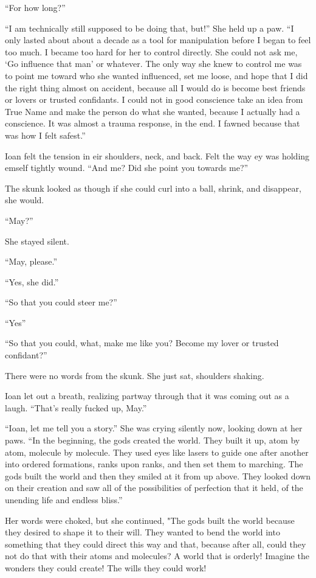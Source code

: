 ``For how long?''

``I am technically still supposed to be doing that, but!'' She held up a paw. ``I only lasted about about a decade as a tool for manipulation before I began to feel too much. I became too hard for her to control directly. She could not ask me, `Go influence that man' or whatever. The only way she knew to control me was to point me toward who she wanted influenced, set me loose, and hope that I did the right thing almost on accident, because all I would do is become best friends or lovers or trusted confidants. I could not in good conscience take an idea from True Name and make the person do what she wanted, because I actually had a conscience. It was almost a trauma response, in the end. I fawned because that was how I felt safest.''

Ioan felt the tension in eir shoulders, neck, and back. Felt the way ey was holding emself tightly wound. ``And me? Did she point you towards me?''

The skunk looked as though if she could curl into a ball, shrink, and disappear, she would.

``May?''

She stayed silent.

``May, please.''

``Yes, she did.''

``So that you could steer me?''

``Yes''

``So that you could, what, make me like you? Become my lover or trusted confidant?''

There were no words from the skunk. She just sat, shoulders shaking.

Ioan let out a breath, realizing partway through that it was coming out as a laugh. ``That's really fucked up, May.''

``Ioan, let me tell you a story.'' She was crying silently now, looking down at her paws. ``In the beginning, the gods created the world. They built it up, atom by atom, molecule by molecule. They used eyes like lasers to guide one after another into ordered formations, ranks upon ranks, and then set them to marching. The gods built the world and then they smiled at it from up above. They looked down on their creation and saw all of the possibilities of perfection that it held, of the unending life and endless bliss.''

Her words were choked, but she continued, "The gods built the world because they desired to shape it to their will. They wanted to bend the world into something that they could direct this way and that, because after all, could they not do that with their atoms and molecules? A world that is orderly! Imagine the wonders they could create! The wills they could work!


